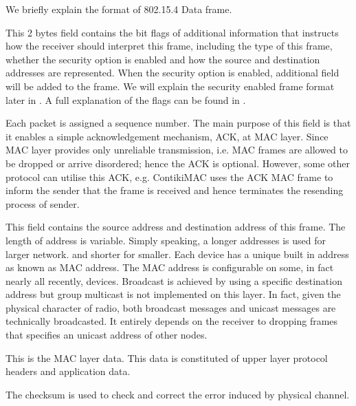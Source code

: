 We briefly explain the format of 802.15.4 Data frame.
\begin{description}[style=nextline]
	\item[\textbf{Frame Control}]
	This 2 bytes field contains the bit flags of additional information that instructs how the receiver should interpret this frame, including the type of this frame, whether the security option is enabled and how the source and destination addresses are represented. When the security option is enabled, additional field will be added to the frame. We will explain the security enabled frame format later in . A full explanation of the flags can be found in \cite{802154}.
	
	\item[\textbf{Sequence Number}]
	Each packet is assigned a sequence number. The main purpose of this field is that it enables a simple acknowledgement mechanism, ACK, at MAC layer. Since MAC layer provides only unreliable transmission, i.e. MAC frames are allowed to be dropped or arrive disordered; hence the ACK is optional. However, some other protocol can utilise this ACK, e.g. ContikiMAC uses the ACK MAC frame to inform the sender that the frame is received and hence terminates the resending process of sender.
	
	\item[\textbf{Address Information}]
	This field contains the source address and destination address of this frame. The length of address is variable. Simply speaking, a longer addresses is used for larger network. and shorter for smaller. Each device has a unique built in address as known as MAC address. The MAC address is configurable on some, in fact nearly all recently, devices. Broadcast is achieved by using a specific destination address but group multicast is not implemented on this layer. In fact, given the physical character of radio, both broadcast messages and unicast messages are technically broadcasted. It entirely depends on the receiver to dropping frames that specifies an unicast address of other nodes.
	
	\item[\textbf{Data}]
	This is the MAC layer data. This data is constituted of upper layer protocol headers and application data.
	
	\item[\textbf{Frame Checksum}]
	The checksum is used to check and correct the error induced by physical channel.
\end{description}

